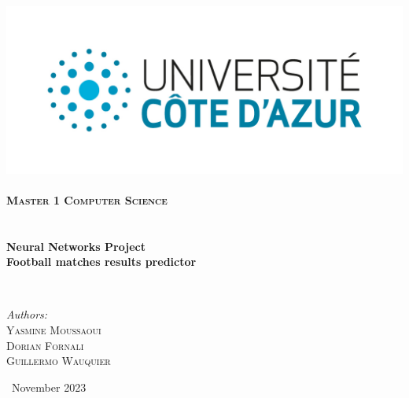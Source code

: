 \begin{titlepage}
\begin{center}

\includegraphics[width=0.35\linewidth]{logo.jpg}~\\[1cm]

\textbf{\textsc{\LARGE Master 1 Computer Science}\\[1.5cm]}
\textsc{\Large }\\[0.5cm]

\HRule \\[0.4cm]

{\huge \bfseries Neural Networks Project\\
Football matches results predictor \\[0.4cm] }

\HRule \\[1.5cm]

\begin{minipage}{0.4\textwidth}
\begin{flushleft} \large
\centering
\emph{Authors:}\\
\textsc{Yasmine Moussaoui}\\
\textsc{Dorian Fornali}\\
\textsc{Guillermo Wauquier}\\
\end{flushleft}
\end{minipage}





\vfill

{\large \ November 2023}

\end{center}
\end{titlepage}


